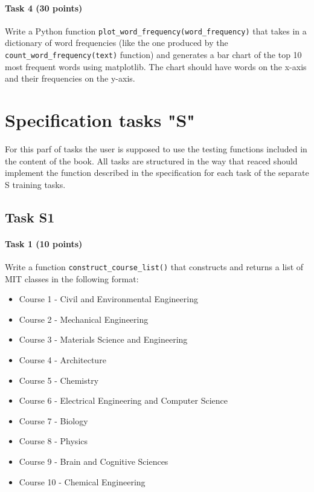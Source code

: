 \documentclass[12pt]{book}
\begin{document}
\subsubsection{Task 4 (30 points)}
Write a Python function \texttt{plot\_word\_frequency(word\_frequency)} that takes in a dictionary of word frequencies (like the one produced by the \texttt{count\_word\_frequency(text)} function) and generates a bar chart of the top 10 most frequent words using matplotlib. The chart should have words on the x-axis and their frequencies on the y-axis.


\newpage
\chapter{Specification tasks "S"}

For this parf of tasks the user is supposed to use the testing functions included in the content of the book. All tasks are structured in the way that reaced should implement the function described in the specification for each task of the separate S training tasks.



\section{Task S1}

\subsubsection{Task 1 (10 points)}
Write a function \texttt{construct\_course\_list()} that constructs and returns a list of MIT classes in the following format:

\begin{itemize}
\item Course 1 - Civil and Environmental Engineering
\item Course 2 - Mechanical Engineering
\item Course 3 - Materials Science and Engineering
\item Course 4 - Architecture
\item Course 5 - Chemistry
\item Course 6 - Electrical Engineering and Computer Science
\item Course 7 - Biology
\item Course 8 - Physics
\item Course 9 - Brain and Cognitive Sciences
\item Course 10 - Chemical Engineering
\end{itemize}
\end{document}
